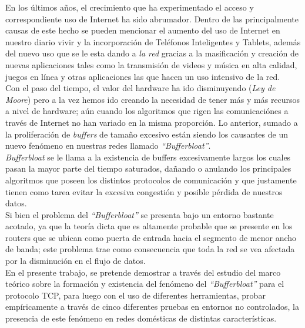 En los \'ultimos a\~nos, el crecimiento que ha experimentado el acceso y correspondiente uso de Internet ha sido abrumador. Dentro de las principalmente causas de este hecho se pueden mencionar el aumento del uso de Internet en nuestro diario vivir y la incorporaci\'on de Tel\'efonos Inteligentes y Tablets,  adem\'as del nuevo uso que se le esta dando a \textit{la red} gracias a la masificaci\'on y creaci\'on de nuevas aplicaciones tales como la transmisi\'on de videos y m\'usica en alta calidad, juegos en l\'inea y otras aplicaciones las que hacen un uso intensivo de la red.
\\

Con el paso del tiempo, el valor del hardware ha ido disminuyendo (\textit{Ley de Moore}) pero a la vez hemos ido creando la necesidad de tener m\'as y m\'as recursos a nivel de hardware; a\'un cuando los algoritmos que rigen las comunicaci\'ones a trav\'es de Internet no han variado en la misma proporci\'on. Lo anterior, sumado a la proliferaci\'on de \textit{buffers} de tama\~no excesivo est\'an siendo los causantes de un nuevo fen\'omeno en nuestras redes llamado \textit{``Bufferbloat''}.
\\

\textit{Bufferbloat} se le llama a la existencia de buffers excesivamente largos los cuales pasan la mayor parte del tiempo saturados, da\~nando o anulando los principales algoritmos que poseen los distintos protocolos de comunicaci\'on y que justamente tienen como tarea evitar la excesiva congesti\'on y posible pérdida de nuestros datos.
\\

Si bien el problema del \textit{``Bufferbloat''} se presenta bajo un entorno bastante acotado, ya que la teor\'ia dicta que es altamente probable que se presente en los routers que se ubican como puerta de entrada hacia el segmento de menor ancho de banda; este problema trae como consecuencia que toda la red se vea afectada por la disminuci\'on en el flujo de datos. 
\\

En el presente trabajo, se pretende demostrar a trav\'es del estudio del marco te\'orico sobre la formaci\'on y existencia del fen\'omeno del \textit{``Bufferbloat''} para el protocolo TCP, para luego con el uso de diferentes herramientas, probar emp\'iricamente a trav\'es de cinco diferentes pruebas en entornos no controlados, la presencia de este fen\'omeno en redes dom\'esticas de distintas caracter\'isticas.
